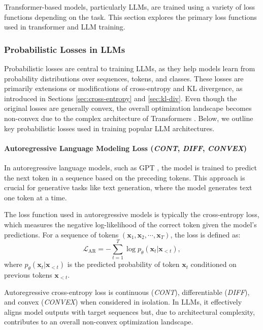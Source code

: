 \documentclass[sn-mathphys-num]{sn-jnl}%
\newcommand \cont{\textit{CONT}}
\newcommand \diff{\textit{DIFF}}
\newcommand \conv{\textit{CONVEX}}
\begin{document}
Transformer-based models, particularly LLMs, are trained using a variety of loss functions depending on the task. This section explores the primary loss functions used in transformer and LLM training. %

\subsubsection{Probabilistic Losses in LLMs}\label{subsec-transformer_probabilistic_losses}
Probabilistic losses are central to training LLMs, as they help models learn from probability distributions over sequences, tokens, and classes. These losses are primarily extensions or modifications of cross-entropy and KL divergence, as introduced in Sections \ref{sec:cross-entropy} and \ref{sec:kl-div}.  Even though the original losses are generally convex, the overall optimization landscape becomes non-convex due to the complex architecture of Transformers \cite{goodfellow2016deep,choi2020fine}. 
Below, we outline key probabilistic losses used in training popular LLM architectures.

\paragraph{Autoregressive Language Modeling Loss (\cont, \diff, \conv)}\label{subsubsec-transformer_autoregressive_loss}
In autoregressive language models, such as GPT \cite{radford2019language}, the model is trained to predict the next token in a sequence based on the preceding tokens. This approach is crucial for generative tasks like text generation, where the model generates text one token at a time.

The loss function used in autoregressive models is typically the cross-entropy loss, which measures the negative log-likelihood of the correct token given the model's predictions. For a sequence of tokens $(\mathbf{x}_1, \mathbf{x}_2, \cdots, \mathbf{x}_T)$, the loss is defined as:
\begin{equation}
    \mathcal{L}_{\text{AR}} = - \sum_{t=1}^{T} \log p_\theta(\mathbf{x}_t | \mathbf{x}_{<t}),
\end{equation}
where \( p_\theta(\mathbf{x}_t | \mathbf{x}_{<t}) \) is the predicted probability of token \( \mathbf{x}_t \) conditioned on previous tokens \( \mathbf{x}_{<t} \).

Autoregressive cross-entropy loss is continuous (\cont), differentiable (\diff), and convex (\conv) when considered in isolation. In LLMs, it effectively aligns model outputs with target sequences but, due to architectural complexity, contributes to an overall non-convex optimization landscape.
\end{document}
